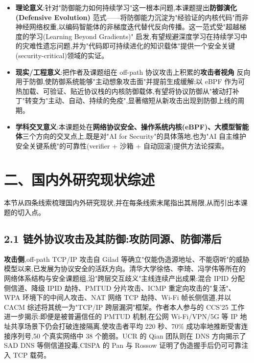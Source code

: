 \begin{itemize}[leftmargin=2em,itemsep=1pt,topsep=2pt]
  \item \textbf{理论意义}:针对"防御能力如何持续学习"这一根本问题,本课题提出\textbf{防御演化(Defensive Evolution)} 范式——将防御能力沉淀为"经验证的内核代码"而非神经网络权重,以编码智能体的非梯度迭代替代反向传播。这一范式受"超越梯度的学习(Learning Beyond Gradients)"\supercite{weng2026hl} 启发,有望规避深度学习在持续学习中的灾难性遗忘问题,并为"代码即可持续进化的知识载体"提供一个安全关键(security-critical)领域的实证。
  \item \textbf{现实/工程意义}:把作者及课题组在 off-path 协议攻击上积累的\textbf{攻击者视角}\supercite{feng2025cacm,feng2025pmtudisolation} 反向用于防御,使防御系统能够"主动想象攻击面"并提前生成缓解;以 eBPF 作为可热加载、可验证、贴近协议栈的内核防御载体,有望将协议防御从"被动打补丁"转变为"主动、自动、持续的免疫",显著缩短从新攻击出现到防御上线的周期。
  \item \textbf{学科交叉意义}:本课题处在\textbf{网络协议安全、操作系统内核(eBPF)、大模型智能体}三个方向的交叉点上,既是对"AI for Security"的具体落地,也为"AI 自主维护安全关键系统"的可靠性(verifier + 沙箱 + 自动回滚)提供方法论探索。
\end{itemize}
\section*{二、国内外研究现状综述}
本节从四条线索梳理国内外研究现状,并在每条线索末尾指出其局限,从而引出本课题的切入点。

\subsection*{2.1 链外协议攻击及其防御:攻防同源、防御滞后}
\textbf{攻击侧},off-path TCP/IP 攻击自 Gilad 等确立"仅能伪造源地址、不能窃听"的威胁模型以来\supercite{gilad2012offpath},已发展为协议安全的活跃方向。清华大学徐恪、李琦、冯学伟等所在的网络体系结构与安全课题组,沿"跨层交互歧义"主线连续产出成果:混合 IPID 分配侧信道\supercite{feng2020mixedipid}、降级 IPID 劫持、PMTUD 分片攻击\supercite{feng2022pmtud}、ICMP 重定向攻击的"复活"、WPA 环境下的中间人攻击、NAT 网络 TCP 劫持\supercite{yang2024natwifi}、Wi-Fi 帧长侧信道\supercite{wang2025packetsize},并以 CACM 综述将其统一为"TCP/IP 跨层漏洞"框架\supercite{feng2025cacm}。作者本人参与的 CCS'25 工作进一步揭示:即便是被普遍信任的 PMTUD 机制,在公网 Wi-Fi/VPN/5G 等 IP 地址共享场景下仍会打破连接隔离,使攻击者平均 220 秒、70\% 成功率地推断受害连接序列号,50 个真实网络中 38 个脆弱\supercite{feng2025pmtudisolation}。UCR 的 Qian 团队则在 DNS 方向揭示了 SAD DNS 等侧信道投毒\supercite{man2020saddns},CISPA 的 Pan 与 Rossow 证明了伪造握手后仍可可靠注入 TCP 载荷\supercite{pan2024tcpspoofing}。

